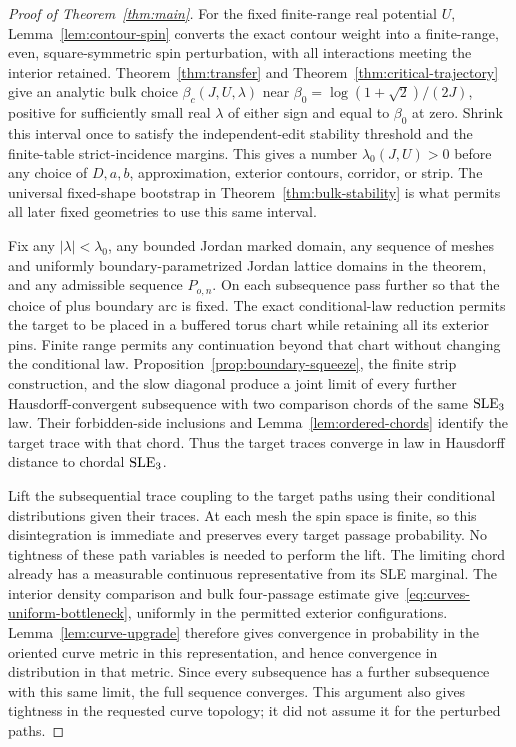 \begin{proof}[Proof of Theorem~\ref{thm:main}]
For the fixed finite-range real potential $U$, Lemma~\ref{lem:contour-spin}
converts the exact contour weight into a finite-range, even,
square-symmetric spin perturbation, with all interactions meeting the
interior retained.  Theorem~\ref{thm:transfer} and
Theorem~\ref{thm:critical-trajectory} give an analytic bulk choice
$\beta_c(J,U,\lambda)$ near
$\beta_0=\log(1+\sqrt2)/(2J)$, positive for sufficiently small real
$\lambda$ of either sign and equal to $\beta_0$ at zero.  Shrink this
interval once to satisfy the independent-edit stability threshold and
the finite-table strict-incidence margins.  This gives a number
$\lambda_0(J,U)>0$ before any choice of $D,a,b$, approximation, exterior
contours, corridor, or strip.  The universal fixed-shape bootstrap in
Theorem~\ref{thm:bulk-stability} is what permits all later fixed
geometries to use this same interval.

Fix any $|\lambda|<\lambda_0$, any bounded Jordan marked domain, any
sequence of meshes and uniformly boundary-parametrized Jordan lattice
domains in the theorem, and any admissible sequence $P_{o,n}$.  On each
subsequence pass further so that the choice of plus boundary arc is
fixed.  The exact conditional-law reduction permits the target to be
placed in a buffered torus chart while retaining all its exterior pins.
Finite range permits any continuation beyond that chart without changing
the conditional law.  Proposition~\ref{prop:boundary-squeeze}, the
finite strip construction, and the slow diagonal produce a joint limit
of every further Hausdorff-convergent subsequence with two comparison
chords of the same $\operatorname{SLE}_3$ law.  Their forbidden-side inclusions and
Lemma~\ref{lem:ordered-chords} identify the target trace with that chord.
Thus the target traces converge in law in Hausdorff distance to chordal
$\operatorname{SLE}_3$.

Lift the subsequential trace coupling to the target paths using their
conditional distributions given their traces.  At each mesh the spin
space is finite, so this disintegration is immediate and preserves every
target passage probability.  No tightness of these path variables is
needed to perform the lift.  The limiting chord already has a measurable
continuous representative from its SLE marginal.  The interior density
comparison and bulk
four-passage estimate give~\eqref{eq:curves-uniform-bottleneck}, uniformly
in the permitted exterior configurations.  Lemma~\ref{lem:curve-upgrade}
therefore gives convergence in probability in the oriented curve metric
in this representation, and hence convergence in distribution in that
metric.  Since every subsequence has a further subsequence with this
same limit, the full sequence converges.  This argument also gives
tightness in the requested curve topology; it did not assume it for
the perturbed paths.


\end{proof}
